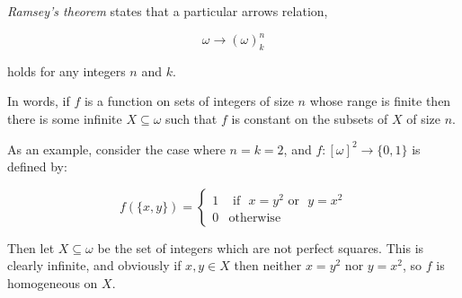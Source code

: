 \documentclass[12pt]{article}
\begin{document}
\emph{Ramsey's theorem} states that a particular arrows relation,

$$\omega\rightarrow(\omega)^n_k$$

holds for any integers $n$ and $k$.

In words, if $f$ is a function on sets of integers of size $n$ whose range is finite then there is some infinite $X\subseteq\omega$ such that $f$ is constant on the subsets of $X$ of size $n$.

As an example, consider the case where $n=k=2$, and $f\colon [\omega]^2\rightarrow\{0,1\}$ is defined by:

$$f(\{x,y\})=\left\{
\begin{array}{ll}
1&\text{ if ~} x=y^2 \text{ or ~} y=x^2\\
0&\text{otherwise}
\end{array}\right.$$

Then let $X\subseteq\omega$ be the set of integers which are not perfect squares.  This is clearly infinite, and obviously if $x,y\in X$ then neither $x=y^2$ nor $y=x^2$, so $f$ is homogeneous on $X$.
\end{document}
